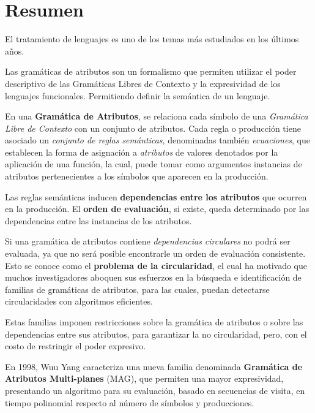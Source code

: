 \documentclass[a4paper,11pt]{ThesisStyle}
\begin{document}
\dominitoc
{}


 \cleardoublepage
\chapter*{Resumen}

El tratamiento de lenguajes es uno de los temas más estudiados en los últimos años.

Las gramáticas de atributos son un formalismo que permiten utilizar el poder descriptivo de las Gramáticas Libres de Contexto y la expresividad de los lenguajes funcionales. Permitiendo definir la semántica de un lenguaje.

En una \textbf{Gramática de Atributos}, se relaciona cada símbolo de una \textit{Gramática Libre de Contexto} con un conjunto de atributos. Cada regla o producción tiene asociado un \textit{conjunto de reglas semánticas}, denominadas también \textit{ecuaciones}, que establecen la forma de asignación a \textit{atributos} de valores denotados por la aplicación de una función, la cual, puede tomar como argumentos instancias de atributos pertenecientes a los símbolos que aparecen en la producción.

Las reglas semánticas inducen \textbf{dependencias entre los atributos} que ocurren en la producción. El \textbf{orden de evaluación}, si existe, queda determinado por las dependencias entre las instancias de los atributos.

Si una gramática de atributos contiene \textit{dependencias circulares} no podrá ser evaluada, ya que no será posible encontrarle un orden de evaluación consistente. Esto se conoce como el \textbf{problema de la circularidad}, el cual ha motivado que muchos investigadores aboquen sus esfuerzos en la búsqueda e identificación de familias de gramáticas de atributos, para las cuales, puedan detectarse circularidades con algoritmos eficientes.

Estas familias imponen restricciones sobre la gramática de atributos o sobre las dependencias entre sus atributos, para garantizar la no circularidad, pero, con el costo de restringir el poder expresivo.

En 1998, Wuu Yang caracteriza una nueva familia denominada \textbf{Gramática de Atributos Multi-planes} (MAG), que permiten una mayor expresividad, presentando un algoritmo para su evaluación, basado en secuencias de visita, en tiempo polinomial respecto al número de símbolos y producciones.
\end{document}
